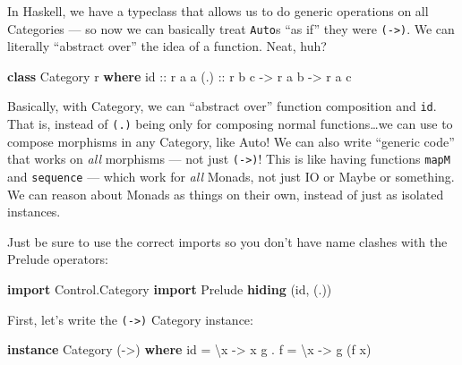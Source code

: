 \documentclass[]{article}
\newenvironment{Shaded}{}{}
\newcommand{\DataTypeTok}[1]{\textcolor[rgb]{0.56,0.13,0.00}{#1}}
\newcommand{\FunctionTok}[1]{\textcolor[rgb]{0.02,0.16,0.49}{#1}}
\newcommand{\KeywordTok}[1]{\textcolor[rgb]{0.00,0.44,0.13}{\textbf{#1}}}
\newcommand{\NormalTok}[1]{#1}
\newcommand{\OperatorTok}[1]{\textcolor[rgb]{0.40,0.40,0.40}{#1}}
\newcommand{\OtherTok}[1]{\textcolor[rgb]{0.00,0.44,0.13}{#1}}
\begin{document}
In Haskell, we have a typeclass that allows us to do generic operations on all
Categories --- so now we can basically treat \texttt{Auto}s ``as if'' they were
\texttt{(-\textgreater{})}. We can literally ``abstract over'' the idea of a
function. Neat, huh?

\begin{Shaded}
\begin{Highlighting}[]
\KeywordTok{class} \DataTypeTok{Category}\NormalTok{ r }\KeywordTok{where}
\OtherTok{    id  ::}\NormalTok{ r a a}
\OtherTok{    (.) ::}\NormalTok{ r b c }\OtherTok{{-}>}\NormalTok{ r a b }\OtherTok{{-}>}\NormalTok{ r a c}
\end{Highlighting}
\end{Shaded}

Basically, with Category, we can ``abstract over'' function composition and
\texttt{id}. That is, instead of \texttt{(.)} being only for composing normal
functions\ldots we can use to compose morphisms in any Category, like Auto! We
can also write ``generic code'' that works on \emph{all} morphisms --- not just
\texttt{(-\textgreater{})}! This is like having functions \texttt{mapM} and
\texttt{sequence} --- which work for \emph{all} Monads, not just IO or Maybe or
something. We can reason about Monads as things on their own, instead of just as
isolated instances.

Just be sure to use the correct imports so you don't have name clashes with the
Prelude operators:

\begin{Shaded}
\begin{Highlighting}[]
\KeywordTok{import} \DataTypeTok{Control.Category}
\KeywordTok{import} \DataTypeTok{Prelude} \KeywordTok{hiding}\NormalTok{ (id, (.))}
\end{Highlighting}
\end{Shaded}

First, let's write the \texttt{(-\textgreater{})} Category instance:

\begin{Shaded}
\begin{Highlighting}[]
\KeywordTok{instance} \DataTypeTok{Category}\NormalTok{ (}\OtherTok{{-}>}\NormalTok{) }\KeywordTok{where}
    \FunctionTok{id}    \OtherTok{=}\NormalTok{ \textbackslash{}x }\OtherTok{{-}>}\NormalTok{ x}
\NormalTok{    g }\OperatorTok{.}\NormalTok{ f }\OtherTok{=}\NormalTok{ \textbackslash{}x }\OtherTok{{-}>}\NormalTok{ g (f x)}
\end{Highlighting}
\end{Shaded}
\end{document}
